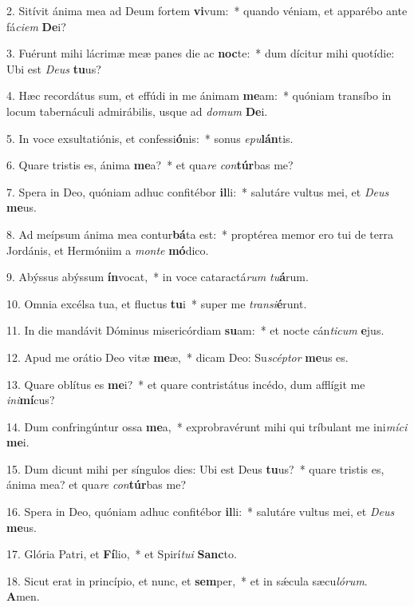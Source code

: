 2. Sitívit ánima mea ad Deum fortem \textbf{vi}vum:~*  quando véniam, et apparébo ante fá\textit{ci}\textit{em} \textbf{De}i?\

3. Fuérunt mihi lácrimæ meæ panes die ac \textbf{noc}te:~*  dum dícitur mihi quotídie: Ubi est \textit{De}\textit{us} \textbf{tu}us?\

4. Hæc recordátus sum, et effúdi in me ánimam \textbf{me}am:~*  quóniam transíbo in locum tabernáculi admirábilis, usque ad \textit{do}\textit{mum} \textbf{De}i.\

5. In voce exsultatiónis, et confessi\textbf{ó}nis:~*  sonus \textit{e}\textit{pu}\textbf{lán}tis.\

6. Quare tristis es, ánima \textbf{me}a?~*  et qua\textit{re} \textit{con}\textbf{túr}bas me?\

7. Spera in Deo, quóniam adhuc confitébor \textbf{il}li:~*  salutáre vultus mei, et \textit{De}\textit{us} \textbf{me}us.\

8. Ad meípsum ánima mea contur\textbf{bá}ta est:~*  proptérea memor ero tui de terra Jordánis, et Hermóniim a \textit{mon}\textit{te} \textbf{mó}dico.\

9. Abýssus abýssum \textbf{ín}vocat,~*  in voce cataractá\textit{rum} \textit{tu}\textbf{á}rum.\

10. Omnia excélsa tua, et fluctus \textbf{tu}i~*  super me \textit{trans}\textit{i}\textbf{é}runt.\

11. In die mandávit Dóminus misericórdiam \textbf{su}am:~*  et nocte cán\textit{ti}\textit{cum} \textbf{e}jus.\

12. Apud me orátio Deo vitæ \textbf{me}æ,~*  dicam Deo: Su\textit{scép}\textit{tor} \textbf{me}us es.\

13. Quare oblítus es \textbf{me}i?~*  et quare contristátus incédo, dum afflígit me \textit{in}\textit{i}\textbf{mí}cus?\

14. Dum confringúntur ossa \textbf{me}a,~*  exprobravérunt mihi qui tríbulant me ini\textit{mí}\textit{ci} \textbf{me}i.\

15. Dum dicunt mihi per síngulos dies: Ubi est Deus \textbf{tu}us?~*  quare tristis es, ánima mea? et qua\textit{re} \textit{con}\textbf{túr}bas me?\

16. Spera in Deo, quóniam adhuc confitébor \textbf{il}li:~*  salutáre vultus mei, et \textit{De}\textit{us} \textbf{me}us.\

17. Glória Patri, et \textbf{Fí}lio,~*  et Spirí\textit{tu}\textit{i} \textbf{Sanc}to.\

18. Sicut erat in princípio, et nunc, et \textbf{sem}per,~*  et in sǽcula sæcu\textit{ló}\textit{rum}. \textbf{A}men.\

